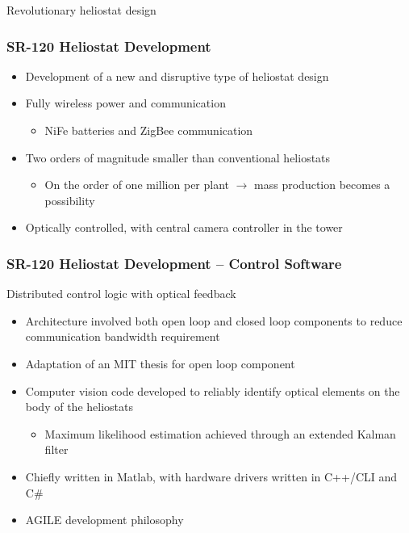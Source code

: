 \documentclass[aspectratio=169]{beamer}
\begin{document}
\begin{frame}
  Revolutionary heliostat design
  \frametitle{SR-120 Heliostat Development}
  \begin{itemize}
  \item Development of a new and disruptive type of heliostat design
  \item Fully wireless power and communication
    \begin{itemize}
    \item NiFe batteries and ZigBee communication
    \end{itemize}
  \item Two orders of magnitude smaller than conventional heliostats
    \begin{itemize}
    \item On the order of one million per plant $\rightarrow$ mass
      production becomes a possibility
    \end{itemize}
  \item Optically controlled, with central camera controller in the
    tower
  \end{itemize}
\end{frame}

\begin{frame}
  \frametitle{SR-120 Heliostat Development -- Control Software}
  Distributed control logic with optical feedback
  \begin{itemize}
  \item Architecture involved both open loop and closed loop
    components to reduce communication bandwidth requirement
  \item Adaptation of an MIT thesis for open loop component
  \item Computer vision code developed to reliably identify optical
    elements on the body of the heliostats
    \begin{itemize}
    \item Maximum likelihood estimation achieved through an extended
      Kalman filter
    \end{itemize}
  \item Chiefly written in Matlab, with hardware drivers written in
    C++/CLI and C\#
  \item AGILE development philosophy
  \end{itemize}
\end{frame}
\end{document}
